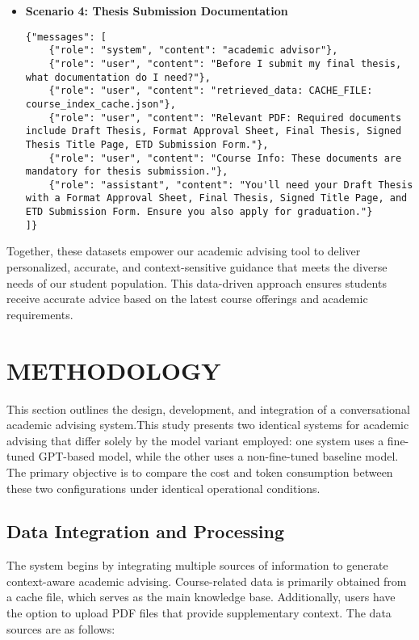 \documentclass[12pt,oneside,openany]{report}
\begin{document}
\begin{itemize}
\item \textbf{Scenario 4: Thesis Submission Documentation}
\begin{lstlisting}[breaklines=true]
{"messages": [
    {"role": "system", "content": "academic advisor"},
    {"role": "user", "content": "Before I submit my final thesis, what documentation do I need?"},
    {"role": "user", "content": "retrieved_data: CACHE_FILE: course_index_cache.json"},
    {"role": "user", "content": "Relevant PDF: Required documents include Draft Thesis, Format Approval Sheet, Final Thesis, Signed Thesis Title Page, ETD Submission Form."},
    {"role": "user", "content": "Course Info: These documents are mandatory for thesis submission."},
    {"role": "assistant", "content": "You'll need your Draft Thesis with a Format Approval Sheet, Final Thesis, Signed Title Page, and ETD Submission Form. Ensure you also apply for graduation."}
]}
\end{lstlisting}

\end{itemize}







Together, these datasets empower our academic advising tool to deliver personalized, accurate, and context-sensitive guidance that meets the diverse needs of our student population. This data-driven approach ensures students receive accurate advice based on the latest course offerings and academic requirements.


\chapter{METHODOLOGY}
This section outlines the design, development, and integration of a conversational academic advising system.This study presents two identical systems for academic advising that differ solely by the model variant employed: one system uses a fine-tuned GPT-based model, while the other uses a non-fine-tuned baseline model. The primary objective is to compare the cost and token consumption between these two configurations under identical operational conditions.

\section{Data Integration and Processing}
The system begins by integrating multiple sources of information to generate context-aware academic advising. Course-related data is primarily obtained from a cache file, which serves as the main knowledge base. Additionally, users have the option to upload PDF files that provide supplementary context. The data sources are as follows:
\end{document}
